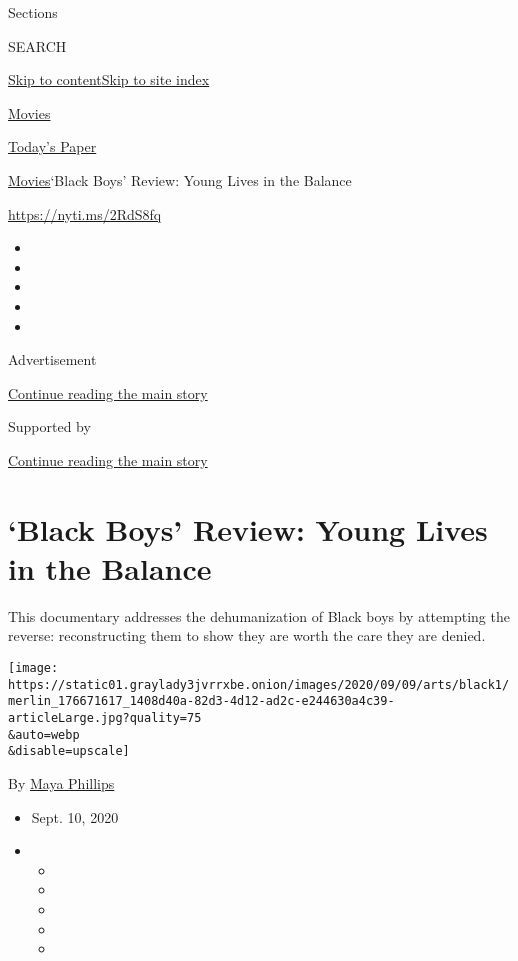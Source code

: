 Sections

SEARCH

\protect\hyperlink{site-content}{Skip to
content}\protect\hyperlink{site-index}{Skip to site index}

\href{https://www.nytimes3xbfgragh.onion/section/movies}{Movies}

\href{https://myaccount.nytimes3xbfgragh.onion/auth/login?response_type=cookie\&client_id=vi}{}

\href{https://www.nytimes3xbfgragh.onion/section/todayspaper}{Today's
Paper}

\href{/section/movies}{Movies}\textbar{}`Black Boys' Review: Young Lives
in the Balance

\url{https://nyti.ms/2RdS8fq}

\begin{itemize}
\item
\item
\item
\item
\item
\end{itemize}

Advertisement

\protect\hyperlink{after-top}{Continue reading the main story}

Supported by

\protect\hyperlink{after-sponsor}{Continue reading the main story}

\hypertarget{black-boys-review-young-lives-in-the-balance}{%
\section{`Black Boys' Review: Young Lives in the
Balance}\label{black-boys-review-young-lives-in-the-balance}}

This documentary addresses the dehumanization of Black boys by
attempting the reverse: reconstructing them to show they are worth the
care they are denied.

\texttt{[image: https://static01.graylady3jvrrxbe.onion/images/2020/09/09/arts/black1/merlin\_176671617\_1408d40a-82d3-4d12-ad2c-e244630a4c39-articleLarge.jpg?quality=75\\\&auto=webp\\\&disable=upscale]}

By \href{https://www.nytimes3xbfgragh.onion/by/maya-phillips}{Maya
Phillips}

\begin{itemize}
\item
  Sept. 10, 2020
\item
  \begin{itemize}
  \item
  \item
  \item
  \item
  \item
  \end{itemize}
\end{itemize}


